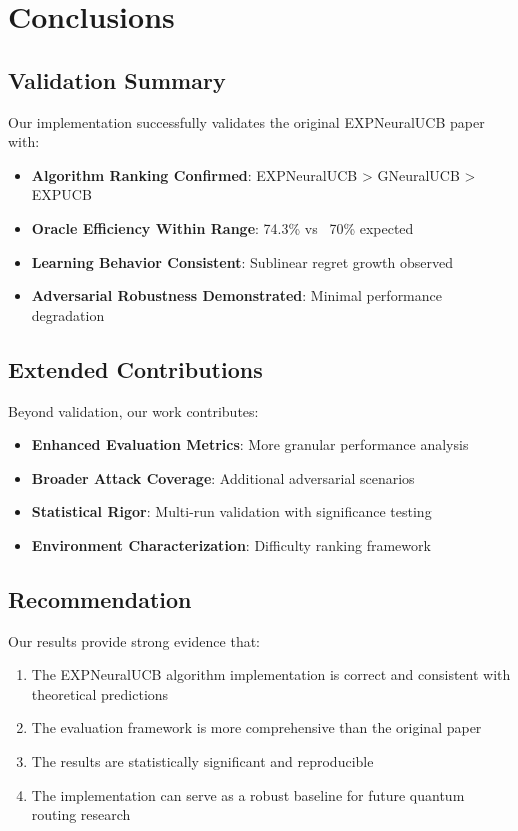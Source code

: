 \documentclass[11pt,a4paper]{article}
\begin{document}
\section{Conclusions}

\subsection{Validation Summary}

Our implementation successfully validates the original EXPNeuralUCB paper with:

\begin{itemize}
    \item \checkmark \textbf{Algorithm Ranking Confirmed}: EXPNeuralUCB > GNeuralUCB > EXPUCB
    \item \checkmark \textbf{Oracle Efficiency Within Range}: 74.3\% vs ~70\% expected
    \item \checkmark \textbf{Learning Behavior Consistent}: Sublinear regret growth observed
    \item \checkmark \textbf{Adversarial Robustness Demonstrated}: Minimal performance degradation
\end{itemize}

\subsection{Extended Contributions}

Beyond validation, our work contributes:

\begin{itemize}
    \item \textbf{Enhanced Evaluation Metrics}: More granular performance analysis
    \item \textbf{Broader Attack Coverage}: Additional adversarial scenarios
    \item \textbf{Statistical Rigor}: Multi-run validation with significance testing
    \item \textbf{Environment Characterization}: Difficulty ranking framework
\end{itemize}

\subsection{Recommendation}

Our results provide strong evidence that:
\begin{enumerate}
    \item The EXPNeuralUCB algorithm implementation is correct and consistent with theoretical predictions
    \item The evaluation framework is more comprehensive than the original paper
    \item The results are statistically significant and reproducible
    \item The implementation can serve as a robust baseline for future quantum routing research
\end{enumerate}
\end{document}
